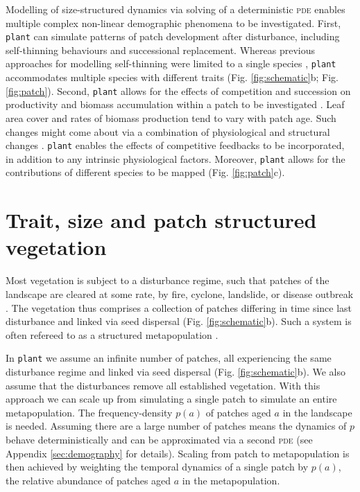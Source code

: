 \documentclass[a4paper,11pt]{article}
\newcommand{\plant}{\texttt{plant}}
\begin{document}
Modelling of size-structured dynamics via solving of a deterministic \textsc{pde}
enables multiple complex non-linear demographic phenomena to be
investigated. First, {\plant} can simulate patterns of patch development after
disturbance, including self-thinning behaviours and successional
replacement. Whereas previous approaches for modelling self-thinning
were limited to a single species
\citep[e.g.][]{Barnes-2004, Coomes-2007}, {\plant} accommodates multiple
 species with different traits (Fig. \ref{fig:schematic}b; Fig.
\ref{fig:patch}). Second, {\plant} allows for the effects of competition and succession on
productivity and biomass accumulation within a patch to be investigated
\citep{Falster-2011}. Leaf area cover and rates of biomass production
tend to vary with patch age. Such changes might come about via a
combination of physiological and structural changes
\citep{Binkley-2002, Smith-2001, Coomes-2007, Ogawa-2010}. {\plant} enables
the effects of competitive feedbacks to be incorporated, in addition to
any intrinsic physiological factors. Moreover, {\plant} allows for the
contributions of different species to be mapped (Fig. \ref{fig:patch}c).

\section{Trait, size and patch structured vegetation}

Most vegetation is subject to a disturbance regime, such that patches of
the landscape are cleared at some rate, by fire, cyclone, landslide, or
disease outbreak
\citep{White-1979, Bormann-1979, Coomes-2007, Chambers-2013}.
The vegetation thus comprises a collection of patches differing in time
since last disturbance and linked via seed dispersal (Fig.
\ref{fig:schematic}b). Such a system is often refereed to as a
structured metapopulation \citep{Gyllenberg-2001}.

In {\plant} we assume an infinite number of patches, all experiencing
the same disturbance regime and linked via seed dispersal (Fig.
\ref{fig:schematic}b). We also assume that the disturbances remove
all established vegetation.  With this approach we can scale up from
simulating a single patch to simulate an entire metapopulation.
The frequency-density
\(p(a)\) of patches aged \(a\) in the landscape is needed. Assuming there
are a large number of patches means the dynamics of \(p\) behave
deterministically and can be approximated via a second \textsc{pde}
(see Appendix \ref{sec:demography} for
details). Scaling from patch to metapopulation is then achieved by
weighting the temporal dynamics of a single patch by \(p(a)\), the
relative abundance of patches aged \(a\) in the metapopulation.
\end{document}
